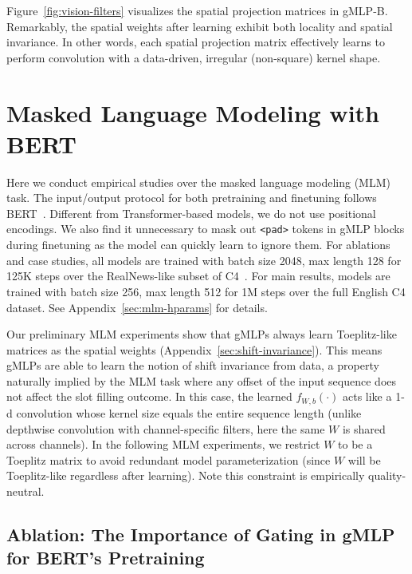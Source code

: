\documentclass{article}
\newcommand{\gffn}{gMLP\xspace}
\begin{document}
Figure~\ref{fig:vision-filters} visualizes the spatial projection matrices in \gffn-B.
Remarkably,
the spatial weights after learning exhibit both locality and spatial invariance.
In other words,
each spatial projection matrix effectively learns to perform convolution with a data-driven, irregular (non-square) kernel shape.

\section{Masked Language Modeling with BERT}
\label{sec:mlm}
Here we conduct empirical studies over the masked language modeling (MLM) task. The input/output protocol for both pretraining and finetuning follows BERT~\cite{devlin2018bert}. 
Different from Transformer-based models, we do not use positional encodings. We also find it unnecessary to mask out \texttt{<pad>} tokens in \gffn blocks during finetuning as the model can quickly learn to ignore them.
For ablations and case studies,
all models are trained with batch size 2048, max length 128 for 125K steps over the RealNews-like subset of C4~\cite{raffel2019exploring}.
For main results, models are trained with batch size 256, max length 512 for 1M steps over the full English C4 dataset.
See Appendix~\ref{sec:mlm-hparams} for details.

Our preliminary MLM experiments show that gMLPs always learn Toeplitz-like matrices as the spatial weights (Appendix~\ref{sec:shift-invariance}).
This means gMLPs are able to learn the notion of shift invariance from data, a property naturally implied by the MLM task where any offset of the input sequence does not affect the slot filling outcome.
In this case,
the learned $f_{W,b}(\cdot)$ acts like a 1-d convolution whose kernel size equals the entire sequence length (unlike depthwise convolution with channel-specific filters, here the same $W$ is shared across channels).
In the following MLM experiments,
we restrict $W$ to be a Toeplitz matrix to avoid redundant model parameterization (since $W$ will be Toeplitz-like regardless after learning).
Note this constraint is empirically quality-neutral.

\subsection{Ablation: The Importance of Gating in \gffn for BERT's Pretraining}
\label{sec:baselines}
\end{document}
